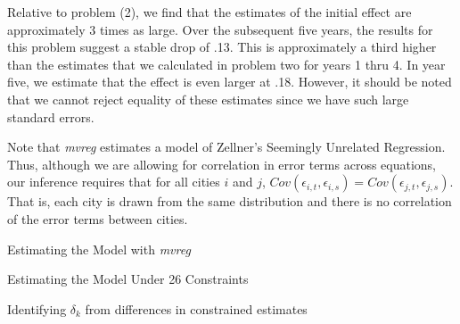 \documentclass[11pt]{article}
\begin{document}
\begin{enumerate}[1)]
\begin{enumerate}[(a)]
		Relative to problem (2), we find that the estimates of the initial effect are approximately 3 times as large. Over the subsequent five years, the results for this problem suggest a stable drop of .13. This is approximately a third higher than the estimates that we calculated in problem two for years 1 thru 4. In year five, we estimate that the effect is even larger at .18. However, it should be noted that we cannot reject equality of these estimates since we have such large standard errors.

		Note that \textit{mvreg} estimates a model of Zellner's Seemingly Unrelated Regression. Thus, although we are allowing for correlation in error terms across equations, our inference requires that for all cities $i$ and $j$, $Cov(\epsilon_{i,t},\epsilon_{i,s}) = Cov(\epsilon_{j,t},\epsilon_{j,s})$. That is, each city is drawn from the same distribution and there is no correlation of the error terms between cities.
	\end{enumerate}
\end{enumerate}

\clearpage
\appendix

\begin{table}[h]
	\caption{Estimating the Model with \textit{mvreg}}
	\label{Unconstrained}
	\centering
	
\end{table}

\begin{table}[h]
	\caption{Estimating the Model Under 26 Constraints}
	\label{Constraint_Est}
	\centering
	
\end{table}

\begin{table}[h]
	\caption{Identifying $\delta_k$ from differences in constrained estimates}
	\label{Lincoms}
	\centering
	
\end{table}
\end{document}
